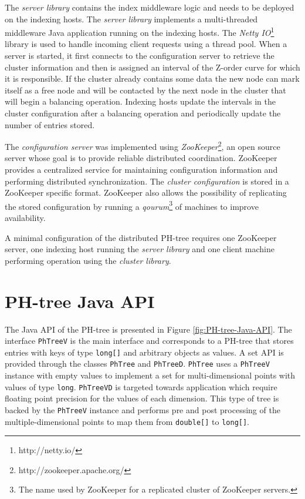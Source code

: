 \documentclass[11pt,a4paper]{globis-book}
\begin{document}
The \textit{server library} contains the index middleware logic and needs to be deployed on the indexing hosts. The \textit{server library} implements a multi-threaded middleware Java application running on the indexing hosts. The \textit{Netty IO}\footnote{http://netty.io/} library is used to handle incoming client requests using a thread pool. When a server is started, it first connects to the configuration server to retrieve the cluster information and then is assigned an interval of the Z-order curve for which it is responsible. If the cluster already contains some data the new node can mark itself as a free node and will be contacted by the next node in the cluster that will begin a balancing operation. Indexing hosts update the intervals in the cluster configuration after a balancing operation and periodically update the number of entries stored. 

The \textit{configuration server} was implemented using \textit{ZooKeeper}\footnote{http://zookeeper.apache.org/}, an open source server whose goal is to provide reliable distributed coordination. ZooKeeper provides a centralized service for maintaining configuration information and performing distributed synchronization. The \textit{cluster configuration} is stored in a ZooKeeper specific format. ZooKeeper also allows the possibility of replicating the stored configuration by running a \textit{qourum}\footnote{The name used by ZooKeeper for a replicated cluster of ZooKeeper servers.} of machines to improve availability. 

A minimal configuration of the distributed PH-tree requires one ZooKeeper server, one indexing host running the \textit{server library} and one client machine performing operation using the \textit{cluster library}.

\section{PH-tree Java API}

The Java API of the PH-tree is presented in Figure \ref{fig:PH-tree-Java-API}. The interface \texttt{PhTreeV} is the main interface and corresponds to a PH-tree that stores entries with keys of type \texttt{long[]} and arbitrary objects as values. A set API is provided through the classes \texttt{PhTree} and \texttt{PhTreeD}. \texttt{PhTree} uses a \texttt{PhTreeV} instance with empty values to implement a set for multi-dimensional points with values of type \texttt{long}. \texttt{PhTreeVD} is targeted towards application which require floating point precision for the values of each dimension. This type of tree is backed by the \texttt{PhTreeV} instance and performs pre and post processing of the multiple-dimensional points to map them from \texttt{double[]} to \texttt{long[]}.
\end{document}
